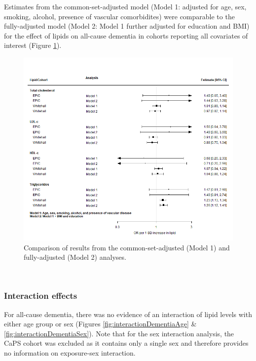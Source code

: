 \documentclass[a4paper, twoside]{templates/ociamthesis}
\begin{document}
Estimates from the common-set-adjusted model (Model 1: adjusted for age, sex, smoking, alcohol, presence of vascular comorbidites) were comparable to the fully-adjusted model (Model 2: Model 1 further adjusted for education and BMI) for the effect of lipids on all-cause dementia in cohorts reporting all covariates of interest (Figure \ref{fig:ipdModelComparison}).





\begin{figure}[H]
\includegraphics[width=1\linewidth]{figures/ipd/main_model_comparison} \caption[Comparison of partially and maximally adjusted results]{Comparison of results from the common-set-adjusted (Model 1) and fully-adjusted (Model 2) analyses.}\label{fig:ipdModelComparison}
\end{figure}

~

\hypertarget{interaction-effects}{%
\subsubsection{Interaction effects}\label{interaction-effects}}

For all-cause dementia, there was no evidence of an interaction of lipid levels with either age group or sex (Figures \ref{fig:interactionDementiaAge} \& \ref{fig:interactionDementiaSex}). Note that for the sex interaction analysis, the CaPS cohort was excluded as it contains only a single sex and therefore provides no information on exposure-sex interaction.
\end{document}
